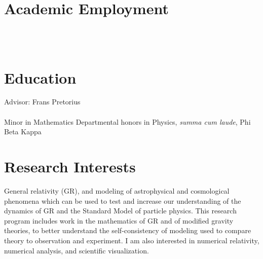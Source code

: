 \documentclass{my_cv}
\begin{document}
\bigskip
{}
\section{Academic Employment}
\noindent
{}
\\ \\
\section{Education}
\noindent
{}
\indentline
   Advisor: Frans Pretorius
\\ \\
\indentline
   Minor in Mathematics
\indentline
   Departmental honors in Physics, \emph{summa cum laude}, Phi Beta Kappa
\section{Research Interests}
	General relativity (GR), and modeling of
astrophysical and cosmological phenomena which can be used
to test and increase our understanding of the dynamics of GR and the 
Standard Model of particle physics.
This research program includes work in
the mathematics of GR and of modified gravity theories, to better understand
the self-consistency of modeling used to compare theory to observation and
experiment.
I am also interested in numerical relativity, numerical analysis, and
scientific visualization.
\end{document}
